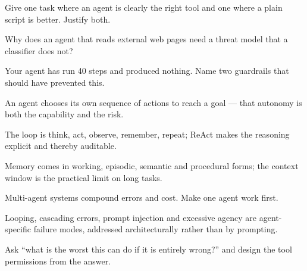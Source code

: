 \begin{checkpoint}
\begin{tightnum}
  \item Give one task where an agent is clearly the right tool and one where a
        plain script is better. Justify both.
  \item Why does an agent that reads external web pages need a threat model that a
        classifier does not?
  \item Your agent has run 40 steps and produced nothing. Name two guardrails that
        should have prevented this.
\end{tightnum}
\end{checkpoint}

\begin{chaptersummary}
\begin{tight}
  \item An agent chooses its own sequence of actions to reach a goal --- that
        autonomy is both the capability and the risk.
  \item The loop is think, act, observe, remember, repeat; ReAct makes the reasoning
        explicit and thereby auditable.
  \item Memory comes in working, episodic, semantic and procedural forms; the
        context window is the practical limit on long tasks.
  \item Multi-agent systems compound errors and cost. Make one agent work first.
  \item Looping, cascading errors, prompt injection and excessive agency are
        agent-specific failure modes, addressed architecturally rather than by
        prompting.
  \item Ask ``what is the worst this can do if it is entirely wrong?'' and design
        the tool permissions from the answer.
\end{tight}
\end{chaptersummary}

